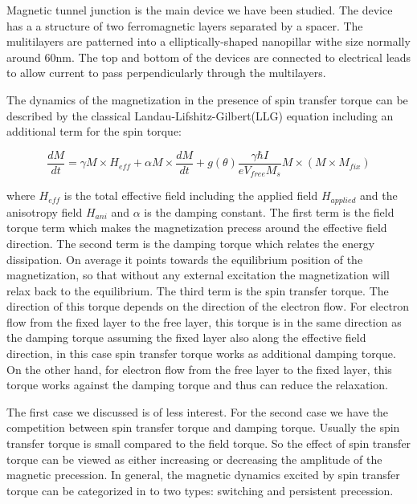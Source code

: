 Magnetic tunnel junction is the main device we have been studied. The device has a a structure of two ferromagnetic layers separated by a spacer. The mulitilayers are patterned into a elliptically-shaped nanopillar withe size normally around 60nm. The top and bottom of the devices are connected to electrical leads to allow current to pass perpendicularly through the multilayers.

The dynamics of the magnetization in the presence of spin transfer torque can be described by the classical Landau-Lifshitz-Gilbert(LLG) equation including an additional term for the spin torque:

\begin{equation}
\frac{dM}{dt} = \gamma M \times H_{eff} + \alpha M \times \frac{dM}{dt} + g(\theta)\frac{\gamma \hbar I}{eV_{free}M_s}M \times(M \times M_{fix})
\end{equation}

where $H_{eff}$ is the total effective field including the applied field $H_{applied}$ and the anisotropy field $H_{ani}$ and $\alpha$ is the damping constant. The first term is the field torque term which makes the magnetization precess around the effective field direction. The second term is the damping torque which relates the energy dissipation. On average it points towards the equilibrium position of the magnetization, so that without any external excitation the magnetization will relax back to the equilibrium. The third term is the spin transfer torque. The direction of this torque depends on the direction of the electron flow. For electron flow from the fixed layer to the free layer, this torque is in the same direction as the damping torque assuming the fixed layer also along the effective field direction, in this case spin transfer torque works as additional damping torque. On the other hand, for electron flow from the free layer to the fixed layer, this torque works against the damping torque and thus can reduce the relaxation.

The first case we discussed is of less interest. For the second case we have the competition between spin transfer torque and damping torque\cite{Bias}. Usually the spin transfer torque is small compared to the field torque. So the effect of spin transfer torque can be viewed as either increasing or decreasing the amplitude of the magnetic precession. In general, the magnetic dynamics excited by spin transfer torque can be categorized in to two types: switching and persistent precession.

